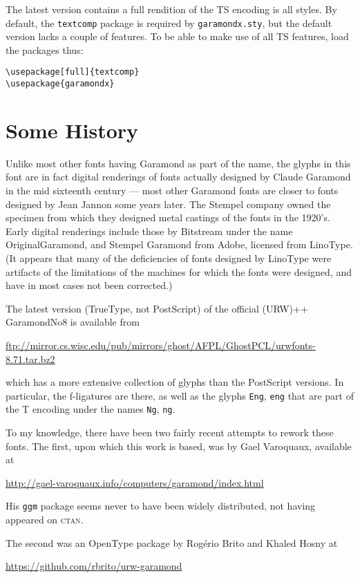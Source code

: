 \documentclass[11pt]{article}
\begin{document}
The latest version contains a full rendition of the TS encoding is all styles. By default, the \verb|textcomp| package is required by {\tt garamondx.sty}, but the default version lacks a couple of features. To be able to make use of all TS features, load the packages thus:
\begin{verbatim}
\usepackage[full]{textcomp}
\usepackage{garamondx}
\end{verbatim}

\section{Some History}
Unlike most other fonts having Garamond as part of the name, the glyphs in this font are in fact digital renderings of fonts actually designed by Claude Garamond in the mid sixteenth century --- most other Garamond fonts are closer to fonts designed by Jean Jannon some years later. The Stempel company owned the specimen from which they designed metal castings of the fonts in the 1920's. Early digital renderings include those by Bitstream under the name OriginalGaramond, and Stempel Garamond from Adobe,  licensed from LinoType. (It appears that many of the deficiencies of fonts designed by LinoType were artifacts of the limitations of the machines for which the fonts were designed, and have in most cases not been corrected.) 

The latest version (TrueType, not PostScript) of the official (URW)++ GaramondNo8 is available from

\url{ftp://mirror.cs.wisc.edu/pub/mirrors/ghost/AFPL/GhostPCL/urwfonts-8.71.tar.bz2}

which has a more extensive collection of glyphs than the PostScript versions. In particular, the f-ligatures are there, as well as the glyphs \texttt{Eng}, \texttt{eng} that are part of the T encoding under the names \texttt{Ng}, \texttt{ng}.

To my knowledge, there have been two fairly recent attempts to rework these fonts. The first, upon which this work is based, was by Gael Varoquaux, available at

\url{http://gael-varoquaux.info/computers/garamond/index.html}

His \texttt{ggm} package seems never to have been widely distributed, not having appeared on \textsc{ctan}. 

The second was an OpenType package by Rog\'erio Brito and Khaled Hosny at

\url{https://github.com/rbrito/urw-garamond}
\end{document}
